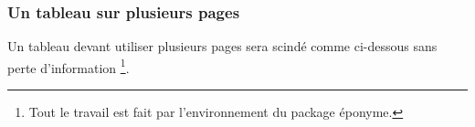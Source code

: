 \documentclass[12pt,a4paper]{article}
\begin{document}


\subsubsection{Un tableau sur plusieurs pages}

Un tableau devant utiliser plusieurs pages sera scindé comme ci-dessous sans perte d'information
\footnote{
	Tout le travail est fait par l'environnement  du package éponyme.
}.

\begin{center}
\end{center}
\end{document}
